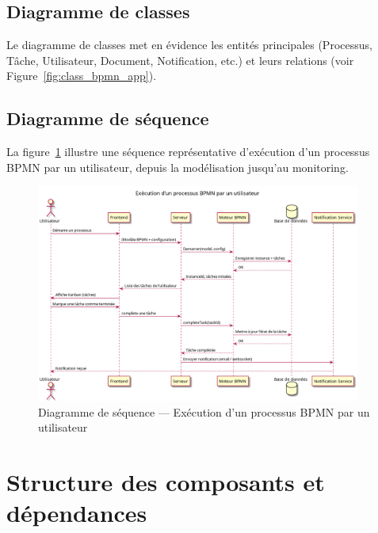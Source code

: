 \subsection{Diagramme de classes}
Le diagramme de classes met en évidence les entités principales (Processus, Tâche, Utilisateur, Document, Notification, etc.) et leurs relations (voir Figure~\ref{fig:class_bpmn_app}).  

\subsection{Diagramme de séquence}
La figure~\ref{fig:seq_exec_bpmn} illustre une séquence représentative d'exécution d'un processus BPMN par un utilisateur, depuis la modélisation jusqu’au monitoring.
\begin{figure}[h]
    \centering
    \includegraphics[width=0.95\textwidth]{Images/sequence.png}
    \caption{Diagramme de séquence — Exécution d’un processus BPMN par un utilisateur}
    \label{fig:seq_exec_bpmn}
\end{figure}

\section{Structure des composants et dépendances}


